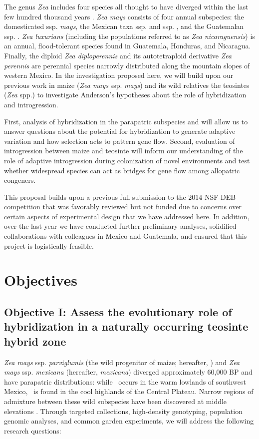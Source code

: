 The genus \emph{Zea} includes four species all thought to have diverged within the last few hundred thousand years \citep{Ross-Ibarra2009a}. \emph{Zea mays} consists of four annual subspecies: the domesticated ssp. \emph{mays}, the Mexican taxa ssp. \zp{} and ssp. \zm{}, and the Guatemalan ssp. \zh. \emph{Zea luxurians} (including the populations referred to as \emph{Zea nicaraguensis}) is an annual, flood-tolerant species found in Guatemala, Honduras, and Nicaragua. 
Finally, the diploid \emph{Zea diploperennis} and its autotetraploid derivative \emph{Zea perennis} are perennial species narrowly distributed along the mountain slopes of western Mexico. 
In the investigation proposed here, we will build upon our previous work in maize (\emph{Zea mays} ssp. \emph{mays}) and its wild relatives the teosintes (\emph{Zea} spp.) to investigate Anderson's hypotheses about the role of hybridization and introgression. 

First, analysis of hybridization in the parapatric subspecies \zp{} and \zm{} will allow us to answer questions about the potential for hybridization to generate adaptive variation and how selection acts to pattern gene flow.
Second, evaluation of introgression between maize and teosinte will inform our understanding of the role of adaptive introgression during colonization of novel environments and test whether widespread species can act as bridges for gene flow among allopatric congeners.

This proposal builds upon a previous full submission to the 2014 NSF-DEB competition that was favorably reviewed but not funded due to concerns over certain aspects of experimental design that we have addressed here.
In addition, over the last year we have conducted further preliminary analyses, solidified collaborations with colleagues in Mexico and Guatemala, and ensured that this project is logistically feasible.

\section*{Objectives}
\subsection*{Objective I: Assess the evolutionary role of hybridization in a naturally occurring teosinte hybrid zone}
\emph{Zea mays} ssp. \emph{parviglumis} (the wild progenitor of maize; hereafter, \zp) and \emph{Zea mays} ssp. \emph{mexicana} (hereafter, \emph{mexicana}) diverged approximately 60,000 BP \citep{Ross-Ibarra2009a} and have parapatric distributions: while \zp\ occurs in the warm lowlands of southwest Mexico, \zm\  is found in the cool highlands of the Central Plateau. 
Narrow regions of admixture between these wild subspecies have been discovered at middle elevations \citep{Fukunaga2005, Pyhajarvi2013}. 
Through targeted collections, high-density genotyping, population genomic analyses, and common garden experiments, we will address the following research questions: 


